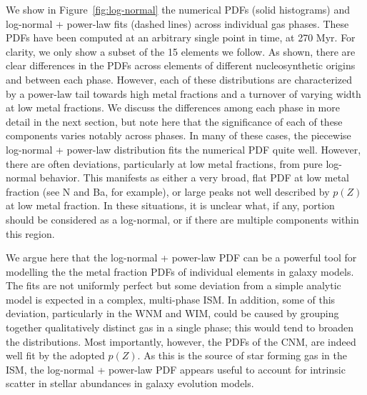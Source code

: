 \documentclass[twocolumn]{aastex61}
\begin{document}
We show in Figure~\ref{fig:log-normal} the numerical PDFs (solid histograms) and log-normal + power-law fits (dashed lines) across individual gas phases. These PDFs have been computed at an arbitrary single point in time, at 270 Myr. For clarity, we only show a subset of the 15 elements we follow. As shown, there are clear differences in the PDFs across elements of different nucleosynthetic origins and between each phase. However, each of these distributions are characterized by a power-law tail towards high metal fractions and a turnover of varying width at low metal fractions. We discuss the differences among each phase in more detail in the next section, but note here that the significance of each of these components varies notably across phases. In many of these cases, the piecewise log-normal + power-law distribution fits the numerical PDF quite well. However, there are often deviations, particularly at low metal fractions, from pure log-normal behavior. This manifests as either a very broad, flat PDF at low metal fraction (see N and Ba, for example), or large peaks not well described by $p(Z)$ at low metal fraction. In these situations, it is unclear what, if any, portion should be considered as a log-normal, or if there are multiple components within this region.

We argue here that the log-normal + power-law PDF can be a powerful tool for modelling the the metal fraction  PDFs of individual elements in galaxy models. The fits are not uniformly perfect but some deviation from a simple analytic model is expected in a complex, multi-phase ISM. In addition, some of this deviation, particularly in the WNM and WIM, could be caused by grouping together qualitatively distinct gas in a single phase; this would tend to broaden the distributions. Most importantly, however, the PDFs of the CNM, are indeed well fit by the adopted $p(Z)$. As this is the source of star forming gas in the ISM, the log-normal + power-law PDF appears useful to account for intrinsic scatter in stellar abundances in galaxy evolution models. 
\end{document}
